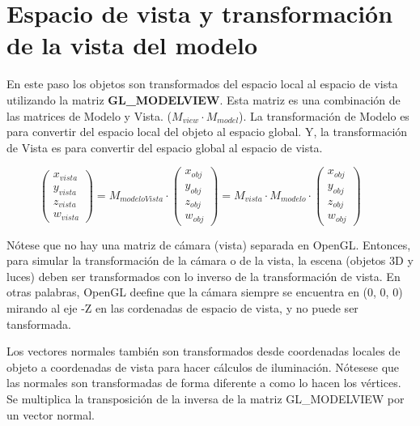 \chapter{Espacio de vista y transformación de la vista del modelo}
En este paso los objetos son transformados del espacio local al espacio de vista utilizando la matriz \textbf{GL\_MODELVIEW}. Esta matriz es una combinación de las matrices de Modelo y Vista. (\(M_{view} \cdot M_{model}\)). La transformación de Modelo es para convertir del espacio local del objeto al espacio global. Y, la transformación de Vista es para convertir del espacio global al espacio de vista.

\begin{figure}[ht]
  \centering
  \(
  \begin{pmatrix}
    x_{vista}\\y_{vista}\\z_{vista}\\w_{vista}
  \end{pmatrix}
  = M_{modeloVista} \cdot
  \begin{pmatrix}
    x_{obj}\\y_{obj}\\z_{obj}\\w_{obj}
  \end{pmatrix}
  = M_{vista} \cdot M_{modelo} \cdot
  \begin{pmatrix}
    x_{obj}\\y_{obj}\\z_{obj}\\w_{obj}
  \end{pmatrix}
  \)
\end{figure}

Nótese que no hay una matriz de cámara (vista) separada en OpenGL. Entonces, para simular la transformación de la cámara o de la vista, la escena (objetos 3D y luces) deben ser transformados con lo inverso de la transformación de vista. En otras palabras, OpenGL deefine que la cámara siempre se encuentra en (0, 0, 0) mirando al eje -Z en las cordenadas de espacio de vista, y no puede ser tansformada.

Los vectores normales también son transformados desde coordenadas locales de objeto a coordenadas de vista para hacer cálculos de iluminación. Nótesese que las normales son transformadas de forma diferente a como lo hacen los vértices. Se multiplica la transposición de la inversa de la matriz GL\_MODELVIEW por un vector normal.

